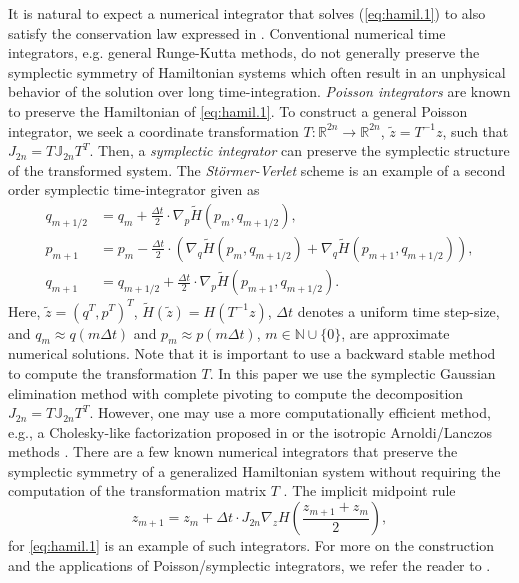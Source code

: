 It is natural to expect a numerical integrator that solves (\ref{eq:hamil.1}) to also satisfy the conservation law expressed in  . Conventional numerical time integrators, e.g. general Runge-Kutta methods, do not generally preserve the symplectic symmetry of Hamiltonian systems which often result in an unphysical behavior of the solution over long time-integration. \emph{Poisson integrators} \cite{Hairer:1250576} are known to preserve the Hamiltonian of \eqref{eq:hamil.1}. To construct a general Poisson integrator, we seek a coordinate transformation $T:\mathbb R^{2n}\to\mathbb R^{2n}$, $\tilde z = T^{-1}z$, such that $J_{2n} = T \mathbb J_{2n} T^T$. Then, a \emph{symplectic integrator} can preserve the symplectic structure of the transformed system. The \emph{St\"ormer-Verlet} scheme is an example of a second order symplectic time-integrator given as
\begin{equation} \label{eq:hamil.6}
	\begin{aligned}
	q_{m+1/2} &= q_m + \frac{\Delta t} 2 \cdot \nabla_p \tilde H(p_m,q_{m+1/2}), \\
	p_{m+1} &= p_m - \frac{\Delta t} 2  \cdot \left( \nabla_q \tilde H(p_m,q_{m+1/2}) + \nabla_{q} \tilde H(p_{m+1},q_{m+1/2}) \right), \\
	q_{m+1} &= q_{m+1/2} + \frac{\Delta t} 2  \cdot  \nabla_p \tilde H(p_{m+1},q_{m+1/2}).
	\end{aligned}
\end{equation}
Here, $\tilde z = (q^T,p^T)^T$, $\tilde H(\tilde z) = H(T^{-1}z)$, $\Delta t$ denotes a uniform time step-size, and $q_m \approx q(m\Delta t)$ and $p_m \approx p(m\Delta t)$, $m \in \mathbb{N} \cup \{ 0\}$, are approximate numerical solutions. Note that it is important to use a backward stable method to compute the transformation $T$. In this paper we use the symplectic Gaussian elimination method with complete pivoting to compute the decomposition $J_{2n} = T \mathbb J_{2n} T^T$. However, one may use a more computationally efficient method, e.g., a Cholesky-like factorization proposed in \cite{benner:chol} or the isotropic Arnoldi/Lanczos methods \cite{doi:10.1137/S1064827500366434}. There are a few known numerical integrators that preserve the symplectic symmetry of a generalized Hamiltonian system without requiring the computation of the transformation matrix $T$ \cite{Hairer:1250576}. The implicit midpoint rule
\begin{equation} \label{eq:hamil.7}
	z_{m+1} = z_{m} + \Delta t \cdot J_{2n} \nabla_z H \left( \frac{z_{m+1} + z_m}{2} \right),
\end{equation}
for \cref{eq:hamil.1} is an example of such integrators. For more on the construction and the applications of Poisson/symplectic integrators, we refer the reader to \cite{Hairer:1250576}.
